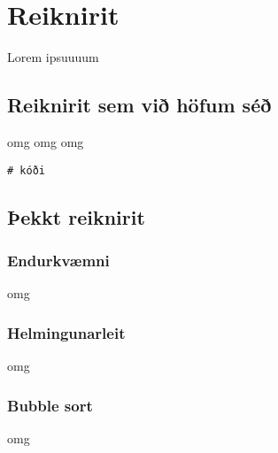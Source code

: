 
\chapter{Reiknirit}\label{k:reiknirit}
Lorem ipsuuuum

\section{Reiknirit sem við höfum séð}\label{uk:reiknirit-okkar}
omg omg omg
\begin{lstlisting}[caption=Við höfum séð eftirfarandi reiknirit, label=lst:reiknirit-okkar]
# kóði
\end{lstlisting}

\section{Þekkt reiknirit}\label{uk:reiknirit-þekkt}

\subsection{Endurkvæmni}\label{uk:reiknirit-endurkvæmni}
omg

\subsection{Helmingunarleit}\label{uk:reiknirit-helmingunarleit}
omg

\subsection{Bubble sort}\label{uk:reiknirit-bubble}
omg

